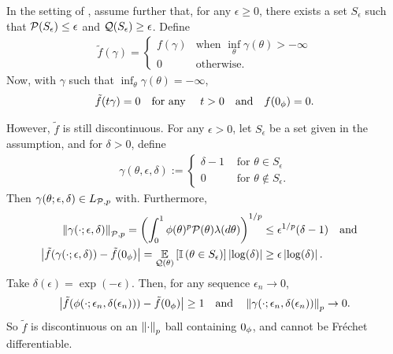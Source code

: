 \begin{ex}
%
In the setting of , assume further that, for any
$\epsilon \ge 0$, there exists a set $S_\epsilon$ such that $\mathcal{P}(S_\epsilon) \le
\epsilon$ and $\mathcal{Q}(S_\epsilon) \ge \epsilon$.  Define
%
\begin{align*}
%
\tilde{f}(\gamma) = \begin{cases}
    f(\gamma) & \textrm{when }\inf_\theta \gamma(\theta) > -\infty \\
    0 & \textrm{otherwise}.
\end{cases}
%
\end{align*}
%
Now, with $\gamma$ such that $\inf_\theta \gamma(\theta) = -\infty$,
%
\begin{align*}
%
\tilde{f}(\t \gamma) = 0 \mathtxt{for any }\t > 0 \mathtxt{and} f(\phiz) = 0.
%
\end{align*}

However, $\tilde{f}$ is still discontinuous.  For any $\epsilon > 0$, let
$S_\epsilon$ be a set given in the assumption, and for $\delta > 0$, define
%
\begin{align*}
%
\gamma(\theta, \epsilon, \delta) :=
\begin{cases}
    \delta - 1      & \textrm{ for }\theta\in S_\epsilon \\
    0      & \textrm{ for }\theta\notin S_\epsilon.
\end{cases}
%
\end{align*}
%
Then $\gamma(\theta; \epsilon, \delta) \in {L_{\mathcal{P},p}}$ with.  Furthermore,
%
\begin{align*}
%
\norm{\gamma(\cdot;
\epsilon, \delta)}_{\p,p} =
    \left( \int_0^1 \phi(\theta)^p \p(\theta
)\lambda(d\theta)\right)^{1/p} \le{}& \epsilon^{1/p} (\delta - 1)  \mathand\\
%
\abs{\tilde{f}(\gamma(\cdot; \epsilon, \delta)) - \tilde{f}(\phiz)} =
    \expect{\q(\theta)}{\ind{\theta \in S_\epsilon}} \abs{\log(\delta)} \ge{}&
    \epsilon \abs{\log(\delta)}.
%
\end{align*}
Take $\delta(\epsilon) = \exp(-\epsilon)$.  Then, for any sequence $\epsilon_n
\rightarrow 0$,
%
\begin{align*}
%
\abs{\tilde{f}(\phi(\cdot; \epsilon_n, \delta(\epsilon_n))) -
     \tilde{f}(\phiz)} \ge{} 1
\mathtxt{and}
\norm{\gamma(\cdot; \epsilon_n, \delta(\epsilon_n))}_p \rightarrow{} 0.
%
\end{align*}
%
So $\tilde{f}$ is discontinuous on an $\left\Vert\cdot\right\Vert_p$ ball containing $0_\phi$,
and cannot be Fr{\'e}chet differentiable.
%
\end{ex}

